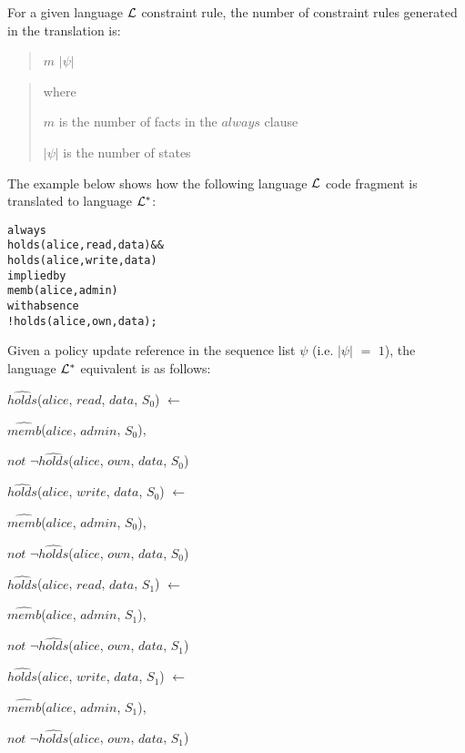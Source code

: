\documentclass[global,twocolumn,final]{svjour}
\newenvironment{vquote}
  {\begin{list}{}{\leftmargin 1em}\item[]}
  {\end{list}}
\newenvironment{vverbatim}
  {\begin{alltt}}
  {\vspace{-\baselineskip}\end{alltt}}
\begin{document}
          For a given language ${\cal L}$ constraint rule, the number of
          constraint rules generated in the translation is:

          \begin{quote}
            $m$ $|\psi|$
          \end{quote}

          \begin{quote}
            where

            $m$ is the number of facts in the $always$ clause

            $|\psi|$ is the number of states
          \end{quote}

          The example below shows how the following language ${\cal L}$ code
          fragment is translated to language ${\cal L}^{*}$:

          \begin{vverbatim}
  always
    holds(alice, read, data) &&
    holds(alice, write, data)
  implied by
    memb(alice, admin)
  with absence
    !holds(alice, own, data);
          \end{vverbatim}

          Given a policy update reference in the sequence list $\psi$ (i.e.
          $|\psi|$ $=$ $1$), the language ${\cal L}^{*}$ equivalent is as
          follows:

          \begin{vquote}
            $\hat{holds}$($alice$, $read$, $data$, $S_{0}$) $\leftarrow$

            \hspace{1em}
            $\hat{memb}$($alice$, $admin$, $S_{0}$),

            \hspace{1em}
            $not$ $\lnot\hat{holds}$($alice$, $own$, $data$, $S_{0}$)

            $\hat{holds}$($alice$, $write$, $data$, $S_{0}$) $\leftarrow$

            \hspace{1em}
            $\hat{memb}$($alice$, $admin$, $S_{0}$),

            \hspace{1em}
            $not$ $\lnot\hat{holds}$($alice$, $own$, $data$, $S_{0}$)

            $\hat{holds}$($alice$, $read$, $data$, $S_{1}$) $\leftarrow$

            \hspace{1em}
            $\hat{memb}$($alice$, $admin$, $S_{1}$),

            \hspace{1em}
            $not$ $\lnot\hat{holds}$($alice$, $own$, $data$, $S_{1}$)

            $\hat{holds}$($alice$, $write$, $data$, $S_{1}$) $\leftarrow$

            \hspace{1em}
            $\hat{memb}$($alice$, $admin$, $S_{1}$),

            \hspace{1em}
            $not$ $\lnot\hat{holds}$($alice$, $own$, $data$, $S_{1}$)
          \end{vquote}
\end{document}
